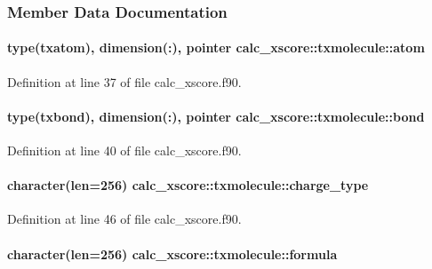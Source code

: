 \subsubsection{Member Data Documentation}
\hypertarget{structcalc__xscore_1_1txmolecule_a9e6e2750caf8ccdef3e7d26f01084839}{
\paragraph[{atom}]{\setlength{\rightskip}{0pt plus 5cm}type({\bf txatom}), dimension(\-:), pointer calc\-\_\-xscore\-::txmolecule\-::atom}}\label{structcalc__xscore_1_1txmolecule_a9e6e2750caf8ccdef3e7d26f01084839}


Definition at line 37 of file calc\-\_\-xscore.\-f90.

\hypertarget{structcalc__xscore_1_1txmolecule_a1a49cf58dc69e094e7ee33bb94b558c9}{
\paragraph[{bond}]{\setlength{\rightskip}{0pt plus 5cm}type({\bf txbond}), dimension(\-:), pointer calc\-\_\-xscore\-::txmolecule\-::bond}}\label{structcalc__xscore_1_1txmolecule_a1a49cf58dc69e094e7ee33bb94b558c9}


Definition at line 40 of file calc\-\_\-xscore.\-f90.

\hypertarget{structcalc__xscore_1_1txmolecule_abe711a08b549133ec39b45072d6547d8}{
\paragraph[{charge\-\_\-type}]{\setlength{\rightskip}{0pt plus 5cm}character(len=256) calc\-\_\-xscore\-::txmolecule\-::charge\-\_\-type}}\label{structcalc__xscore_1_1txmolecule_abe711a08b549133ec39b45072d6547d8}


Definition at line 46 of file calc\-\_\-xscore.\-f90.

\hypertarget{structcalc__xscore_1_1txmolecule_a1f34e11dbb814ee96f65b4e245836679}{
\paragraph[{formula}]{\setlength{\rightskip}{0pt plus 5cm}character(len=256) calc\-\_\-xscore\-::txmolecule\-::formula}}\label{structcalc__xscore_1_1txmolecule_a1f34e11dbb814ee96f65b4e245836679}


